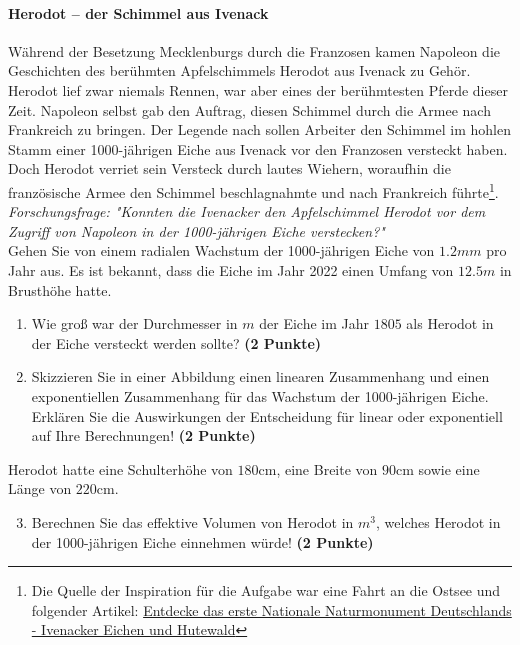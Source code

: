 \documentclass[a4paper, 9pt]{scrartcl}\usepackage[]{graphicx}\usepackage[]{xcolor}
\begin{document}
\paragraph{Herodot – der Schimmel aus Ivenack}

W{\"a}hrend der Besetzung Mecklenburgs durch die Franzosen kamen Napoleon die
Geschichten des ber{\"u}hmten Apfelschimmels Herodot aus Ivenack zu
Geh{\"o}r. Herodot lief zwar niemals Rennen, war aber eines der ber{\"u}hmtesten
Pferde dieser Zeit. Napoleon selbst gab den Auftrag, diesen
Schimmel durch die Armee nach Frankreich zu bringen. Der Legende nach
sollen Arbeiter den Schimmel im hohlen Stamm einer 1000-j{\"a}hrigen Eiche aus Ivenack vor
den Franzosen versteckt haben. Doch Herodot verriet sein Versteck durch
lautes Wiehern, woraufhin die franz{\"o}sische Armee den Schimmel
beschlagnahmte und nach Frankreich f{\"u}hrte\footnote{Die Quelle der Inspiration
  für die Aufgabe war eine Fahrt an die Ostsee und folgender Artikel:
  \href{https://www.wald-mv.de/landingpage/ivenacker-eichen/}{Entdecke das erste Nationale Naturmonument Deutschlands - Ivenacker Eichen und Hutewald}}. \\



\textit{Forschungsfrage: "Konnten die Ivenacker den Apfelschimmel Herodot
  vor dem Zugriff von Napoleon in der 1000-j{\"a}hrigen Eiche verstecken?"} \\

Gehen Sie von einem radialen Wachstum der 1000-j{\"a}hrigen Eiche von
$1.2mm$ pro Jahr aus. Es ist bekannt, dass die Eiche im
Jahr 2022 einen Umfang von $12.5m$ in Brusth{\"o}he hatte.

\begin{enumerate}
\item Wie gro{\ss} war der Durchmesser in $m$ der Eiche im Jahr $1805$ als
  Herodot in der Eiche versteckt werden sollte?
  \textbf{(2 Punkte)}
\item Skizzieren Sie in einer Abbildung einen linearen Zusammenhang und einen
exponentiellen Zusammenhang f{\"u}r das Wachstum der 1000-j{\"a}hrigen Eiche. Erkl{\"a}ren Sie die
Auswirkungen der Entscheidung f{\"u}r linear oder exponentiell auf Ihre
Berechnungen! \textbf{(2 Punkte)}
\end{enumerate}
 
Herodot hatte eine Schulterh{\"o}he von $180$cm, eine Breite von
$90$cm sowie eine L{\"a}nge von  $220$cm.

\begin{enumerate}
  \setcounter{enumi}{2}
\item Berechnen Sie das effektive Volumen von Herodot in $m^3$, welches
  Herodot in der 1000-j{\"a}hrigen Eiche einnehmen w{\"u}rde! \textbf{(2 Punkte)}
\end{enumerate}
\end{document}
